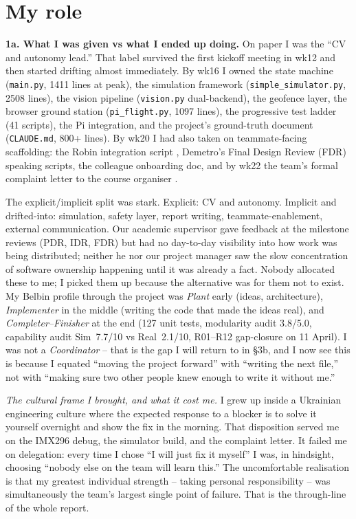 \section{My role}

\textbf{1a. What I was given vs what I ended up doing.}  On paper I was the ``CV and autonomy lead.'' That label survived the first kickoff meeting in wk12 and then started drifting almost immediately. By wk16 I owned the state machine (\texttt{main.py}, 1411 lines at peak), the simulation framework (\texttt{simple\_simulator.py}, 2508 lines), the vision pipeline (\texttt{vision.py} dual-backend), the geofence layer, the browser ground station (\texttt{pi\_flight.py}, 1097 lines), the progressive test ladder (41 scripts), the Pi integration, and the project's ground-truth document (\texttt{CLAUDE.md}, 800+ lines). By wk20 I had also taken on teammate-facing scaffolding: the Robin integration script \cite{robinhandoff}, Demetro's Final Design Review (FDR) speaking scripts, the colleague onboarding doc, and by wk22 the team's formal complaint letter to the course organiser \cite{complaintletter}.

The explicit/implicit split was stark. Explicit: CV and autonomy. Implicit and drifted-into: simulation, safety layer, report writing, teammate-enablement, external communication. Our academic supervisor gave feedback at the milestone reviews (PDR, IDR, FDR) but had no day-to-day visibility into how work was being distributed; neither he nor our project manager saw the slow concentration of software ownership happening until it was already a fact. Nobody allocated these to me; I picked them up because the alternative was for them not to exist. My Belbin \cite{belbin2010} profile through the project was \textit{Plant} early (ideas, architecture), \textit{Implementer} in the middle (writing the code that made the ideas real), and \textit{Completer--Finisher} at the end (127 unit tests, modularity audit 3.8/5.0, capability audit Sim~7.7/10 vs Real~2.1/10, R01--R12 gap-closure on 11 April). I was not a \textit{Coordinator} -- that is the gap I will return to in \S3b, and I now see this is because I equated ``moving the project forward'' with ``writing the next file,'' not with ``making sure two other people knew enough to write it without me.''

\textit{The cultural frame I brought, and what it cost me.} I grew up inside a Ukrainian engineering culture where the expected response to a blocker is to solve it yourself overnight and show the fix in the morning. That disposition served me on the IMX296 debug, the simulator build, and the complaint letter. It failed me on delegation: every time I chose ``I will just fix it myself'' I was, in hindsight, choosing ``nobody else on the team will learn this.'' The uncomfortable realisation \cite{hattonsmith1995} is that my greatest individual strength -- taking personal responsibility -- was simultaneously the team's largest single point of failure. That is the through-line of the whole report.

